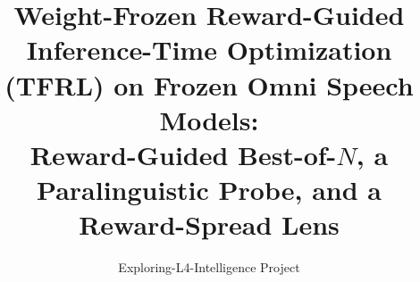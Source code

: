 \newcommand{\cZ}{\ensuremath{\mathcal{Z}}}
\newcommand{\cZA}{\ensuremath{\mathcal{Z}_{\mathrm{A}}}}
\newcommand{\cZB}{\ensuremath{\mathcal{Z}_{\mathrm{B}}}}
\newcommand{\qo}{\ensuremath{q_{0}}}
\newcommand{\qz}{\ensuremath{q}}
\newcommand{\qs}{\ensuremath{q^{\star}}}
\newcommand{\Rwd}{\ensuremath{R}}
\newcommand{\Zpart}{\ensuremath{Z}}
\newcommand{\gain}{\ensuremath{\mathcal{G}}}
\newcommand{\spread}{\ensuremath{\mathrm{spread}}}
\newcommand{\Exp}{\ensuremath{\mathbb{E}}}
\newcommand{\KL}[2]{\ensuremath{\mathrm{KL}\!\left(#1 \,\|\, #2\right)}}
\newcommand{\Fobj}[1]{\ensuremath{F\!\left(#1\right)}}
\newcommand{\R}{\ensuremath{\mathbb{R}}}
\providecommand{\E}{\ensuremath{\mathbb{E}}}
\providecommand{\reals}{\ensuremath{\mathbb{R}}}
\providecommand{\bbR}{\ensuremath{\mathbb{R}}}
\providecommand{\bbN}{\ensuremath{\mathbb{N}}}
\providecommand{\bbZ}{\ensuremath{\mathbb{Z}}}
\providecommand{\bbQ}{\ensuremath{\mathbb{Q}}}
\providecommand{\bbE}{\ensuremath{\mathbb{E}}}
\providecommand{\bbP}{\ensuremath{\mathbb{P}}}
\providecommand{\Tr}{\ensuremath{\mathrm{Tr}}}
\providecommand{\diag}{\ensuremath{\mathrm{diag}}}
\providecommand{\sgn}{\ensuremath{\mathrm{sgn}}}
\providecommand{\eqdef}{\ensuremath{\coloneqq}}
\DeclareMathOperator*{\argmax}{arg\,max}
\DeclareMathOperator*{\argmin}{arg\,min}

\lstset{basicstyle=\ttfamily\footnotesize,breaklines=true,columns=fullflexible,
  keepspaces=true,showstringspaces=false,frame=single,framesep=3pt}

\title{Weight-Frozen Reward-Guided Inference-Time Optimization (TFRL) on Frozen Omni Speech Models:\\[2pt]
\large Reward-Guided Best-of-$N$, a Paralinguistic Probe, and a Reward-Spread Lens}

\author{Exploring-L4-Intelligence Project}
\date{}


\maketitle

